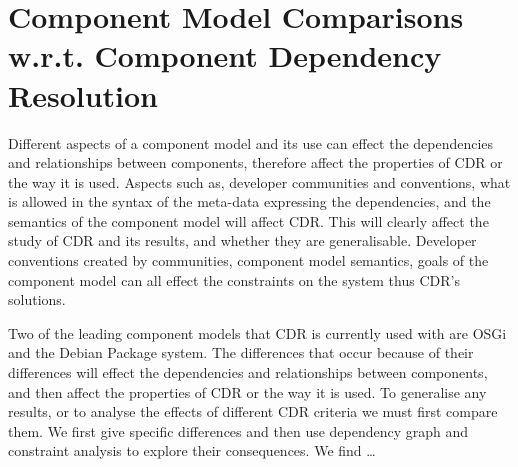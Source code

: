 \chapter{Component Model Comparisons w.r.t. Component Dependency Resolution}
\label{comparison}
{}Different aspects of a component model and its use can effect the dependencies and relationships between components,
{}therefore affect the properties of CDR or the way it is used.
{}Aspects such as, developer communities and conventions, what is allowed in the syntax of the meta-data expressing the dependencies,
{}and the semantics of the component model will affect CDR.
{}This will clearly affect the study of CDR and its results, and whether they are generalisable.
{}Developer conventions created by communities, component model semantics, goals of the component model can all effect the constraints on the system thus CDR's solutions.





Two of the leading component models that CDR is currently used with are OSGi and the Debian Package system.
The differences that occur because of their differences will effect the dependencies and relationships between components,
and then affect the properties of CDR or the way it is used.
To generalise any results, or to analyse the effects of different CDR criteria we must first compare them.
We first give specific differences and then use dependency graph and constraint analysis to explore their consequences.
We find \ldots%

